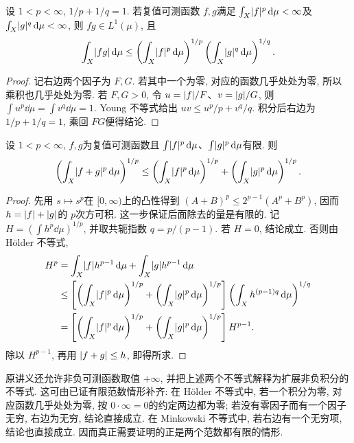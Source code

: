 \begin{theorem}[Hölder不等式]\label{ra:c5:holder}
设 $1<p<\infty$, $1/p+1/q=1$. 若复值可测函数 $f,g$满足 $\int_X\lvert f\rvert^p\,\mathrm d\mu<\infty$及 $\int_X\lvert g\rvert^q\,\mathrm d\mu<\infty$, 则 $fg\in L^1(\mu)$, 且
\[
 \int_X\lvert fg\rvert\,\mathrm d\mu
 \le\left(\int_X\lvert f\rvert^p\,\mathrm d\mu\right)^{1/p}
      \left(\int_X\lvert g\rvert^q\,\mathrm d\mu\right)^{1/q}.
\]
\end{theorem}
\begin{proof}
记右边两个因子为 $F,G$. 若其中一个为零, 对应的函数几乎处处为零, 所以乘积也几乎处处为零. 若 $F,G>0$, 令 $u=\lvert f\rvert/F$、$v=\lvert g\rvert/G$, 则 $\int u^p\dd\mu=\int v^q\dd\mu=1$. Young 不等式给出 $uv\le u^p/p+v^q/q$. 积分后右边为 $1/p+1/q=1$, 乘回 $FG$便得结论.
\end{proof}

\begin{theorem}[Minkowski不等式]\label{ra:c5:minkowski}
设 $1<p<\infty$, $f,g$为复值可测函数且 $\int\lvert f\rvert^p\,\mathrm d\mu$、$\int\lvert g\rvert^p\,\mathrm d\mu$有限. 则
\[
 \left(\int_X\lvert f+g\rvert^p\,\mathrm d\mu\right)^{1/p}
 \le\left(\int_X\lvert f\rvert^p\,\mathrm d\mu\right)^{1/p}
    +\left(\int_X\lvert g\rvert^p\,\mathrm d\mu\right)^{1/p}.
\]
\end{theorem}
\begin{proof}
先用 $s\mapsto s^p$在 $[0,\infty)$上的凸性得到 $(A+B)^p\le2^{p-1}(A^p+B^p)$, 因而 $h=\lvert f\rvert+\lvert g\rvert$的 $p$次方可积. 这一步保证后面除去的量是有限的. 记 $H=(\int h^p\dd\mu)^{1/p}$, 并取共轭指数 $q=p/(p-1)$. 若 $H=0$, 结论成立. 否则由 Hölder 不等式,
\begin{align*}
 H^p&=\int_X\lvert f\rvert h^{p-1}\,\mathrm d\mu+\int_X\lvert g\rvert h^{p-1}\,\mathrm d\mu\\
 &\le\left[\left(\int_X\lvert f\rvert^p\,\mathrm d\mu\right)^{1/p}
            +\left(\int_X\lvert g\rvert^p\,\mathrm d\mu\right)^{1/p}\right]
       \left(\int_X h^{(p-1)q}\,\mathrm d\mu\right)^{1/q}\\
 &=\left[\left(\int_X\lvert f\rvert^p\,\mathrm d\mu\right)^{1/p}
            +\left(\int_X\lvert g\rvert^p\,\mathrm d\mu\right)^{1/p}\right]H^{p-1}.
\end{align*}
除以 $H^{p-1}$, 再用 $\lvert f+g\rvert\le h$, 即得所求.
\end{proof}

\begin{remark}
原讲义还允许非负可测函数取值 $+\infty$, 并把上述两个不等式解释为扩展非负积分的不等式. 这可由已证有限范数情形补齐: 在 Hölder 不等式中, 若一个积分为零, 对应函数几乎处处为零, 按 $0\cdot\infty=0$的约定两边都为零; 若没有零因子而有一个因子无穷, 右边为无穷, 结论直接成立. 在 Minkowski 不等式中, 若右边有一个无穷项, 结论也直接成立. 因而真正需要证明的正是两个范数都有限的情形.
\end{remark}


